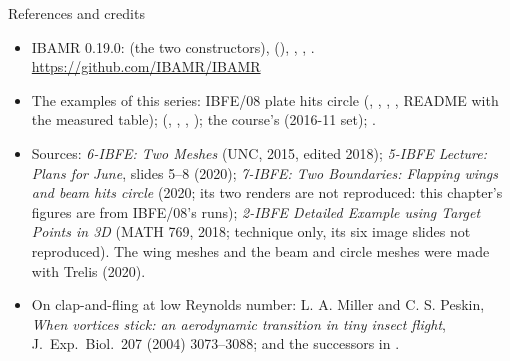 \documentclass[aspectratio=169,11pt]{beamer}
\begin{document}
\begin{frame}{References and credits}
\label{fr:refs}
\scriptsize
\begin{itemize}
  \item IBAMR 0.19.0:  (the two constructors),  (), , , . \url{https://github.com/IBAMR/IBAMR}
  \item The examples of this series: IBFE/08 plate hits circle (, , , , README with the measured table);  (, , , ); the course's  (2016-11 set); .
  \item Sources: \emph{6-IBFE: Two Meshes} (UNC, 2015, edited 2018); \emph{5-IBFE Lecture: Plans for June}, slides 5--8 (2020); \emph{7-IBFE: Two Boundaries: Flapping wings and beam hits circle} (2020; its two renders are not reproduced: this chapter's figures are from IBFE/08's runs); \emph{2-IBFE Detailed Example using Target Points in 3D} (MATH 769, 2018; technique only, its six image slides not reproduced). The wing meshes and the beam and circle meshes were made with Trelis (2020).
  \item On clap-and-fling at low Reynolds number: L. A. Miller and C. S. Peskin, \emph{When vortices stick: an aerodynamic transition in tiny insect flight}, J.\ Exp.\ Biol.\ 207 (2004) 3073--3088; and the successors in .
\end{itemize}
\end{frame}
\end{document}
